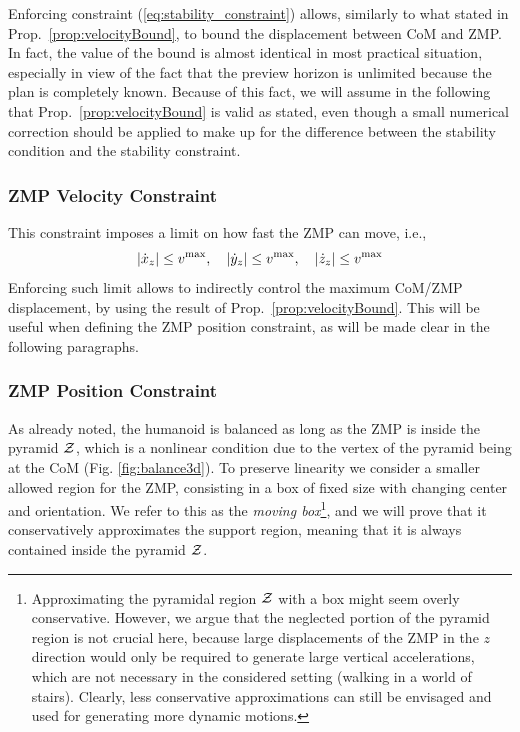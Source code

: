 Enforcing constraint (\ref{eq:stability_constraint}) allows, similarly to what stated in Prop.~\ref{prop:velocityBound}, to bound the displacement between CoM and ZMP. In fact, the value of the bound is almost identical in most practical situation, especially in view of the fact that the preview horizon is unlimited because the plan is completely known. Because of this fact, we will assume in the following that Prop.~\ref{prop:velocityBound} is valid as stated, even though a small numerical correction should be applied to make up for the difference between the stability condition and the stability constraint.



\smallskip

\subsubsection{ZMP Velocity Constraint}

This constraint imposes a limit on how fast the ZMP can move, i.e.,
\begin{equation}\label{eq:ZMP_velocity_constraint}
|\dot x_z|\le v^{\rm max}, \quad |\dot y_z|\le v^{\rm max}, \quad |\dot z_z|\le v^{\rm max}
\end{equation}
Enforcing such limit allows to indirectly control the maximum CoM/ZMP displacement, by using the result of Prop.~\ref{prop:velocityBound}. This will be useful when defining the ZMP position constraint, as will be made clear in the following paragraphs.

\smallskip

\subsubsection{ZMP Position Constraint}
As already noted, the humanoid is balanced as long as the ZMP is inside the pyramid $\cal Z$, which is a nonlinear condition due to the vertex of the pyramid being at the CoM (Fig. \ref{fig:balance3d}). To preserve linearity we consider a smaller allowed region for the ZMP, consisting in a box of fixed size with changing center and orientation. We refer to this as the {\em moving box}\footnote{Approximating the pyramidal region $\cal Z$ with a box might seem overly conservative. However, we argue that the neglected portion of the pyramid region is not crucial here, because large displacements of the ZMP in the $z$ direction would only be required to generate large vertical accelerations, which are not necessary in the considered setting (walking in a world of stairs). Clearly, less conservative approximations can still be envisaged and used for generating more dynamic motions.}, and we will prove that it conservatively approximates the support region, meaning that it is always contained inside the pyramid $\cal Z$.



